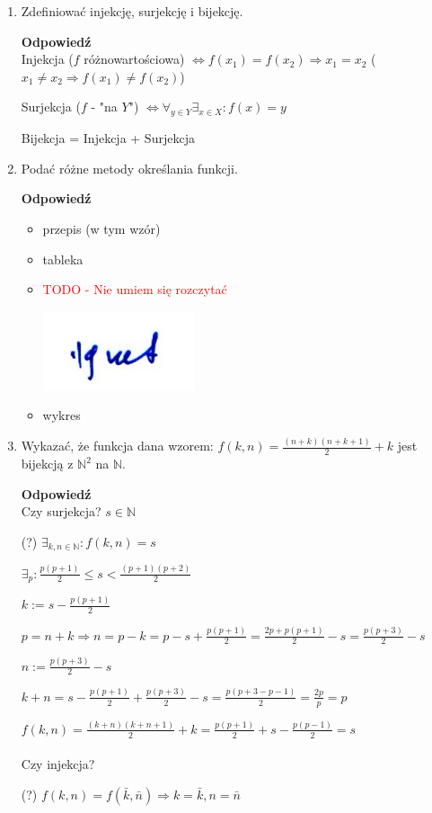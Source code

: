 \documentclass[12pt,a4paper]{article}
\theoremstyle{break}
\newcommand{\Odp}[1]{
		\begin{mdframed}[style=zadanie]
			\textbf{Odpowiedź}\\
			#1
		\end{mdframed}
	}
\begin{document}
\begin{enumerate}[1.]
	\item Zdefiniować injekcję, surjekcję i bijekcję.
	\Odp{
		Injekcja ($f$ różnowartościowa) $\Leftrightarrow f(x_1)=f(x_2)\Rightarrow x_1=x_2$ ($x_1\neq x_2 \Rightarrow f(x_1)\neq f(x_2)$)
		
		Surjekcja ($f$ - "na $Y$") $\Leftrightarrow \forall_{y\in Y} \exists_{x\in X} : f(x)=y$
		
		Bijekcja = Injekcja + Surjekcja
	}
	
	\item Podać różne metody określania funkcji.
	\Odp{
		\begin{itemize}
			\item przepis (w tym wzór)
			\item tableka
			\item \textcolor{red}{TODO - Nie umiem się rozczytać}
			
			\includegraphics{help.jpeg}
			
			\item wykres
		\end{itemize}
	}
	
	\item Wykazać, że funkcja dana wzorem: $f (k, n) = \frac{(n+k)(n+k+1)}{2}+k$ jest bijekcją z $\mathbb{N}^2$ na $\mathbb{N}$.
	\Odp{
		Czy surjekcja? $s\in \mathbb{N}$
		
		(?) $\exists_{k,n\in\mathbb{N}}: f(k,n)=s$
		
		$\exists_p: \frac{p(p+1)}{2}\leq s < \frac{(p+1)(p+2)}{2}$
		
		$k:=s-\frac{p(p+1)}{2}$ 
		
		$p=n+k\Rightarrow n=p-k = p-s+\frac{p(p+1)}{2}=\frac{2p+p(p+1)}{2}-s=\frac{p(p+3)}{2}-s$
		
		$n:=\frac{p(p+3)}{2}-s$
	
		$k+n=s-\frac{p(p+1)}{2}+\frac{p(p+3)}{2}-s=\frac{p(p+3-p-1)}{2}=\frac{2p}{p}=p$
		
		$f(k,n)=\frac{(k+n)(k+n+1)}{2}+k=\frac{p(p+1)}{2}+s-\frac{p(p-1)}{2}=s$\\\\
		
		Czy injekcja?	
		
		(?) $f(k,n) = f(\bar{k},\bar{n})\Rightarrow k=\bar{k}, n=\bar{n}$
		
}
\end{enumerate}
\end{document}

